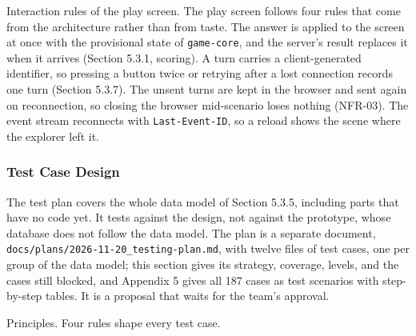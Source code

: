 Interaction rules of the play screen. The play screen follows four rules that come from the architecture rather than from taste. The answer is applied to the screen at once with the provisional state of \texttt{game-\allowbreak{}core}, and the server's result replaces it when it arrives (Section 5.3.1, scoring). A turn carries a client-\allowbreak{}generated identifier, so pressing a button twice or retrying after a lost connection records one turn (Section 5.3.7). The unsent turns are kept in the browser and sent again on reconnection, so closing the browser mid-\allowbreak{}scenario loses nothing (NFR-03). The event stream reconnects with \texttt{Last-\allowbreak{}Event-\allowbreak{}ID}, so a reload shows the scene where the explorer left it.

\subsubsection{Test Case Design}

The test plan covers the whole data model of Section 5.3.5, including parts that have no code yet. It tests against the design, not against the prototype, whose database does not follow the data model. The plan is a separate document, \texttt{docs/\allowbreak{}plans/\allowbreak{}2026-\allowbreak{}11-\allowbreak{}20\_\allowbreak{}testing-\allowbreak{}plan.\allowbreak{}md}, with twelve files of test cases, one per group of the data model; this section gives its strategy, coverage, levels, and the cases still blocked, and Appendix 5 gives all 187 cases as test scenarios with step-\allowbreak{}by-\allowbreak{}step tables. It is a proposal that waits for the team's approval.

Principles. Four rules shape every test case.

